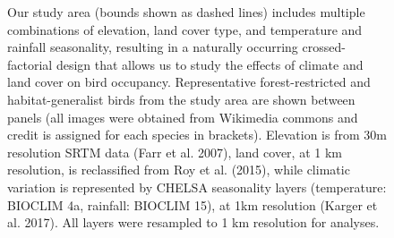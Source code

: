 \begin{figure}[h!]
{        Our study area (bounds shown as dashed lines) includes multiple combinations of elevation, land cover type, and temperature and rainfall seasonality, resulting in a naturally occurring crossed-factorial design that allows us to study the effects of climate and land cover on bird occupancy. 
        Representative forest-restricted and habitat-generalist birds from the study area are shown between panels (all images were obtained from Wikimedia commons and credit is assigned for each species in brackets).
        Elevation is from 30m resolution SRTM data (Farr et al. 2007), land cover, at 1 km resolution, is reclassified from Roy et al. (2015), while climatic variation is represented by CHELSA seasonality layers (temperature: BIOCLIM 4a, rainfall: BIOCLIM 15), at 1km resolution (Karger et al. 2017). All layers were resampled to 1 km resolution for analyses.
    }
    \label{hilly_fig_01}
\end{figure}

